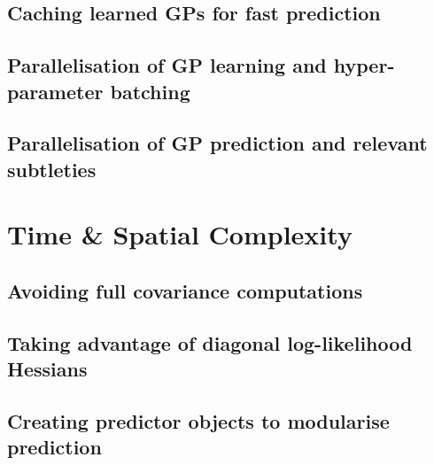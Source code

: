 		\subsection{Caching learned GPs for fast prediction}
		
		\subsection{Parallelisation of GP learning and hyper-parameter batching}
		
		\subsection{Parallelisation of GP prediction and relevant subtleties}
		
		
		
	\section{Time \& Spatial Complexity}
	\label{Appendix:ComputationalAspects:TimeSpaceComplexity}
	
		\subsection{Avoiding full covariance computations}
		\label{Appendix:ComputationalAspects:TimeSpaceComplexity:CovarianceAvoidance}
		
		\subsection{Taking advantage of diagonal log-likelihood Hessians}
		\label{Appendix:ComputationalAspects:TimeSpaceComplexity:DiagonalHessians}
		
		\subsection{Creating predictor objects to modularise prediction}
		
		